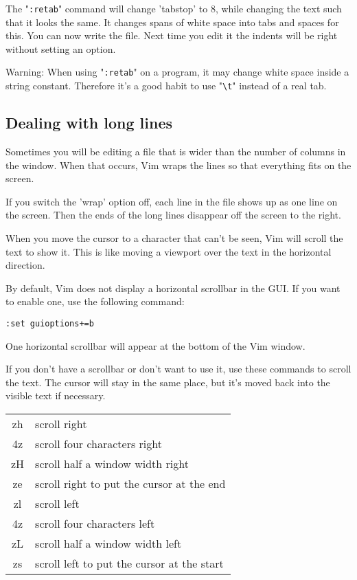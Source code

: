 The "\verb!:retab!" command will change 'tabstop' to 8, while changing the text such that it looks the same.
It changes spans of white space into tabs and spaces for this.
You can now write the file.
Next time you edit it the indents will be right without setting an option.

Warning: When using "\verb!:retab!" on a program, it may change white space inside a string constant.
Therefore it's a good habit to use "\verb!\t!" instead of a real tab.
\subsection{Dealing with long lines}
Sometimes you will be editing a file that is wider than the number of columns in the window.
When that occurs, Vim wraps the lines so that everything fits on the screen.

If you switch the 'wrap' option off, each line in the file shows up as one line on the screen.
Then the ends of the long lines disappear off the screen to the right.

When you move the cursor to a character that can't be seen, Vim will scroll the text to show it.
This is like moving a viewport over the text in the horizontal direction.

By default, Vim does not display a horizontal scrollbar in the GUI.
If you want to enable one, use the following command:

\begin{Verbatim}[samepage=true]
 :set guioptions+=b
\end{Verbatim}

One horizontal scrollbar will appear at the bottom of the Vim window.

If you don't have a scrollbar or don't want to use it, use these commands to scroll the text.
The cursor will stay in the same place, but it's moved back into the visible text if necessary.

\begin{center} \begin{tabular}{c l}
				zh & scroll right \\
				4z & scroll four characters right \\
				zH & scroll half a window width right \\
				ze & scroll right to put the cursor at the end \\
				zl & scroll left \\
				4z & scroll four characters left \\
				zL & scroll half a window width left \\
				zs & scroll left to put the cursor at the start \\
\end{tabular} \end{center}

